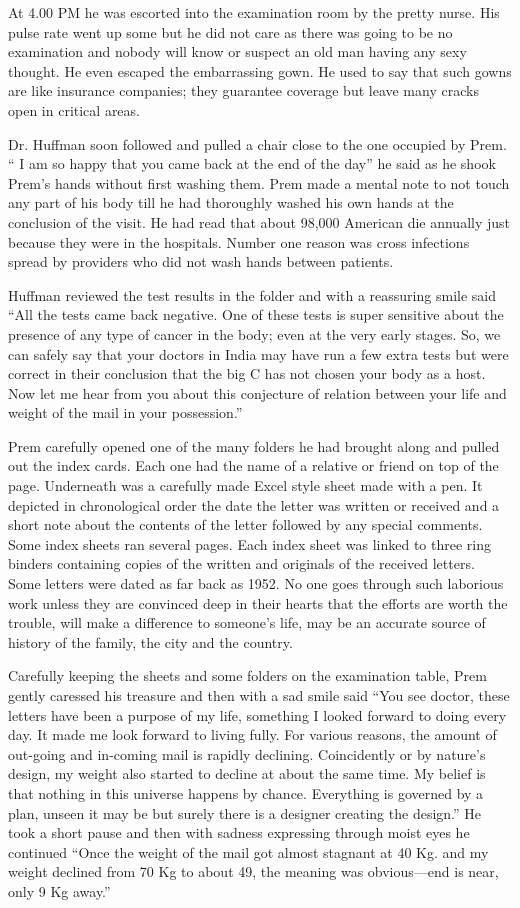 At 4.00 PM he was escorted into the examination room by the pretty
nurse. His pulse rate went up some but he did not care as there was
going to be no examination and nobody will know or suspect an old man
having any sexy thought. He even escaped the embarrassing gown. He used
to say that such gowns are like insurance companies; they guarantee
coverage but leave many cracks open in critical areas.

Dr. Huffman soon followed and pulled a chair close to the one occupied
by Prem. `` I am so happy that you came back at the end of the day'' he
said as he shook Prem's hands without first washing them. Prem made a
mental note to not touch any part of his body till he had thoroughly
washed his own hands at the conclusion of the visit. He had read that
about 98,000 American die annually just because they were in the
hospitals. Number one reason was cross infections spread by providers
who did not wash hands between patients.

Huffman reviewed the test results in the folder and with a reassuring
smile said ``All the tests came back negative. One of these tests is
super sensitive about the presence of any type of cancer in the body;
even at the very early stages. So, we can safely say that your doctors
in India may have run a few extra tests but were correct in their
conclusion that the big C has not chosen your body as a host. Now let me
hear from you about this conjecture of relation between your life and
weight of the mail in your possession.''

Prem carefully opened one of the many folders he had brought along and
pulled out the index cards. Each one had the name of a relative or
friend on top of the page. Underneath was a carefully made Excel style
sheet made with a pen. It depicted in chronological order the date the
letter was written or received and a short note about the contents of
the letter followed by any special comments. Some index sheets ran
several pages. Each index sheet was linked to three ring binders
containing copies of the written and originals of the received letters.
Some letters were dated as far back as 1952. No one goes through such
laborious work unless they are convinced deep in their hearts that the
efforts are worth the trouble, will make a difference to someone's life,
may be an accurate source of history of the family, the city and the
country.

Carefully keeping the sheets and some folders on the examination table,
Prem gently caressed his treasure and then with a sad smile said ``You
see doctor, these letters have been a purpose of my life, something I
looked forward to doing every day. It made me look forward to living
fully. For various reasons, the amount of out-going and in-coming mail
is rapidly declining. Coincidently or by nature's design, my weight also
started to decline at about the same time. My belief is that nothing in
this universe happens by chance. Everything is governed by a plan,
unseen it may be but surely there is a designer creating the design.''
He took a short pause and then with sadness expressing through moist
eyes he continued ``Once the weight of the mail got almost stagnant at
40 Kg. and my weight declined from 70 Kg to about 49, the meaning was
obvious---end is near, only 9 Kg away.''

